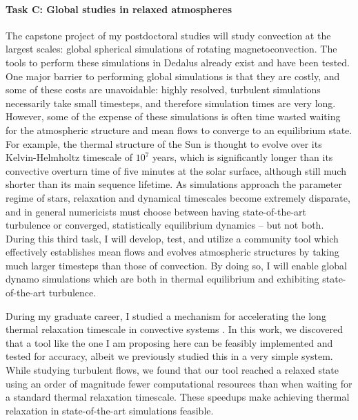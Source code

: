 \documentclass[aasms,11pt, longbibliography]{article}
\begin{document}
\paragraph{\fontsize{12.5pt}{14pt}\selectfont Task C: Global studies in relaxed atmospheres}
\normalsize
\label{sct:taskC}
The capstone project of my postdoctoral studies will study convection at the largest scales: global spherical simulations of rotating magnetoconvection.
The tools to perform these simulations in Dedalus already exist \citep{lecoanet&all2018} and have been tested.
One major barrier to performing global simulations is that they are costly, and some of these costs are unavoidable: highly resolved, turbulent simulations necessarily take small timesteps, and therefore simulation times are very long.
However, some of the expense of these simulations is often time wasted waiting for the atmospheric structure and mean flows to converge to an equilibrium state.
For example, the thermal structure of the Sun is thought to evolve over its Kelvin-Helmholtz timescale of $10^7$ years, which is significantly longer than its convective overturn time of five minutes at the solar surface, although still much shorter than its main sequence lifetime.
As simulations approach the parameter regime of stars, relaxation and dynamical timescales become extremely disparate, and in general numericists must choose between having state-of-the-art turbulence or converged, statistically equilibrium dynamics -- but not both.
During this third task, I will develop, test, and utilize a community tool which effectively establishes mean flows and evolves atmospheric structures by taking much larger timesteps than those of convection.
By doing so, I will enable global dynamo simulations which are both in thermal equilibrium and exhibiting state-of-the-art turbulence.

During my graduate career, I studied a mechanism for accelerating the long thermal relaxation timescale in convective systems \citep{anders&all2018}.
In this work, we discovered that a tool like the one I am proposing here can be feasibly implemented and tested for accuracy, albeit we previously studied this in a very simple system.
While studying turbulent flows, we found that our tool reached a relaxed state using an order of magnitude fewer computational resources than when waiting for a standard thermal relaxation timescale.
These speedups make achieving thermal relaxation in state-of-the-art simulations feasible.
\end{document}

